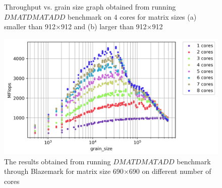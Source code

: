\begin{figure}[H]

	\caption{Throughput vs. grain size graph obtained from running $DMATDMATADD$ benchmark  on $4$ cores for matrix sizes (a) smaller than 912$\times$912 and (b) larger than 912$\times$912}
	\label{fig8}	
\end{figure}

\begin{figure}[H]
	\centering
	\hspace*{-2cm}\includegraphics[scale=.75]{images/fig13.png}
	\caption{The results obtained from running $DMATDMATADD$ benchmark through Blazemark for matrix size 690$\times$690 on different number of cores}	
	\label{fig9}
\end{figure}


